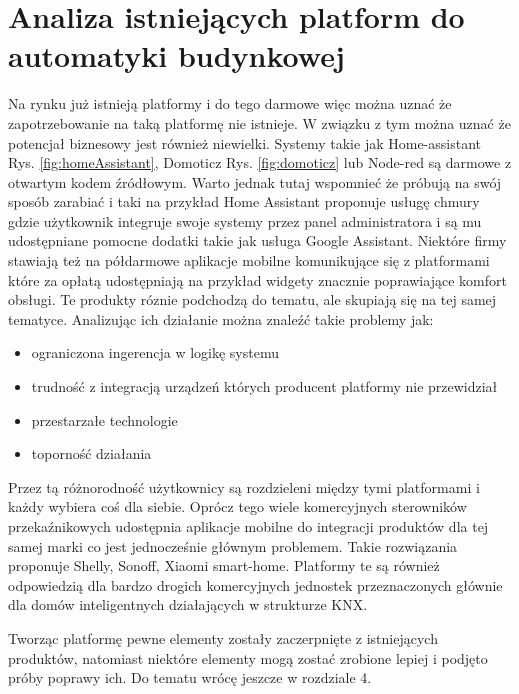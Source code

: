 \chapter{Analiza istniejących platform do automatyki budynkowej}
Na rynku już istnieją platformy i do tego darmowe więc można uznać że zapotrzebowanie na taką platformę nie istnieje. W związku z tym można uznać że potencjał biznesowy jest również niewielki. Systemy takie jak Home-assistant Rys.  \ref{fig:homeAssistant}, Domoticz Rys. \ref{fig:domoticz} lub Node-red są darmowe z otwartym kodem źródłowym. Warto jednak tutaj wspomnieć że próbują na swój sposób zarabiać i taki na przykład Home Assistant proponuje usługę chmury gdzie użytkownik integruje swoje systemy przez panel administratora i są mu udostępniane pomocne dodatki takie jak usługa Google Assistant.
Niektóre firmy stawiają też na półdarmowe aplikacje mobilne komunikujące się z platformami które za opłatą udostępniają na przykład widgety znacznie poprawiające komfort obsługi.
Te produkty róznie podchodzą do tematu, ale skupiają się na tej samej tematyce. Analizując ich działanie można znaleźć takie problemy jak:
\begin{itemize}
    \item ograniczona ingerencja w logikę systemu
    \item trudność z integracją urządzeń których producent platformy nie przewidział
    \item przestarzałe technologie
    \item toporność działania
\end{itemize}
Przez tą różnorodność użytkownicy są rozdzieleni między tymi platformami i każdy wybiera coś dla siebie.
Oprócz tego wiele komercyjnych sterowników przekaźnikowych udostępnia aplikacje mobilne do integracji produktów dla tej samej marki co jest jednocześnie głównym problemem. Takie rozwiązania proponuje Shelly, Sonoff, Xiaomi smart-home. Platformy te są również odpowiedzią dla bardzo drogich komercyjnych jednostek przeznaczonych  głównie dla domów inteligentnych działających w strukturze KNX. 
\par Tworząc platformę pewne elementy zostały zaczerpnięte z istniejących produktów, natomiast niektóre elementy mogą zostać zrobione lepiej i podjęto próby poprawy ich. Do tematu wrócę jeszcze w rozdziale 4.

